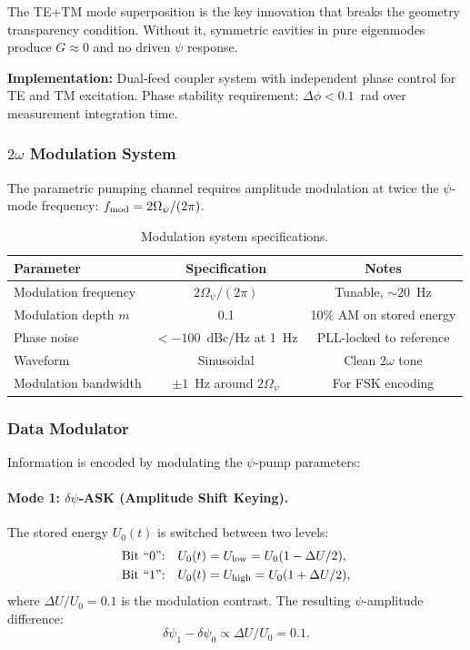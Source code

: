 \documentclass[11pt,onecolumn]{article}
\begin{document}
\begin{tcolorbox}[colback=orange!5,colframe=orange!50!black,
  title=\textbf{Critical Design Choice: TE+TM Superposition}]
The TE+TM mode superposition is the key innovation that breaks the
geometry transparency condition.
Without it, symmetric cavities in pure eigenmodes produce $G \approx 0$
and no driven $\psi$ response.

\textbf{Implementation:} Dual-feed coupler system with independent
phase control for TE and TM excitation.
Phase stability requirement: $\Delta\phi < 0.1$~rad over measurement
integration time.
\end{tcolorbox}

\subsubsection{$2\omega$ Modulation System}

The parametric pumping channel requires amplitude modulation at twice
the $\psi$-mode frequency: $f_{\rm mod} = 2\Omega_\psi/(2\pi)$.

\begin{table}[H]
\centering
\caption{Modulation system specifications.}
\label{tab:mod-specs}
\begin{tabular}{lcc}
\toprule
Parameter & Specification & Notes \\
\midrule
Modulation frequency & $2\Omega_\psi/(2\pi)$ & Tunable, $\sim 20$~Hz \\
Modulation depth $m$ & 0.1 & 10\% AM on stored energy \\
Phase noise & $< -100$~dBc/Hz at 1~Hz & PLL-locked to reference \\
Waveform & Sinusoidal & Clean $2\omega$ tone \\
Modulation bandwidth & $\pm 1$~Hz around $2\Omega_\psi$ & For FSK encoding \\
\bottomrule
\end{tabular}
\end{table}

\subsubsection{Data Modulator}

Information is encoded by modulating the $\psi$-pump parameters:

\paragraph{Mode 1: $\delta\psi$-ASK (Amplitude Shift Keying).}
The stored energy $U_0(t)$ is switched between two levels:
\begin{align}
\text{Bit ``0'':} &\quad U_0(t) = U_{\rm low} = U_0(1 - \Delta U/2), \\
\text{Bit ``1'':} &\quad U_0(t) = U_{\rm high} = U_0(1 + \Delta U/2),
\end{align}
where $\Delta U / U_0 = 0.1$ is the modulation contrast.
The resulting $\psi$-amplitude difference:
\begin{equation}
\delta\psi_1 - \delta\psi_0 \propto \Delta U / U_0 = 0.1.
\end{equation}
\end{document}
